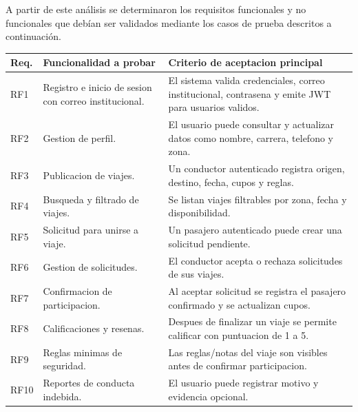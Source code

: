 \documentclass{article}
\begin{document}
A partir de este análisis se determinaron los requisitos funcionales y no funcionales que debían ser validados mediante los casos de prueba descritos a continuación.
\begin{longtable}{p{1.2cm} p{6.2cm} p{6.8cm}}
    \toprule
    \textbf{Req.} & \textbf{Funcionalidad a probar}                       & \textbf{Criterio de aceptacion principal}                                                           \\
    \midrule
    RF1           & Registro e inicio de sesion con correo institucional. & El sistema valida credenciales, correo institucional, contrasena y emite JWT para usuarios validos. \\
    RF2           & Gestion de perfil.                                    & El usuario puede consultar y actualizar datos como nombre, carrera, telefono y zona.                \\
    RF3           & Publicacion de viajes.                                & Un conductor autenticado registra origen, destino, fecha, cupos y reglas.                           \\
    RF4           & Busqueda y filtrado de viajes.                        & Se listan viajes filtrables por zona, fecha y disponibilidad.                                       \\
    RF5           & Solicitud para unirse a viaje.                        & Un pasajero autenticado puede crear una solicitud pendiente.                                        \\
    RF6           & Gestion de solicitudes.                               & El conductor acepta o rechaza solicitudes de sus viajes.                                            \\
    RF7           & Confirmacion de participacion.                        & Al aceptar solicitud se registra el pasajero confirmado y se actualizan cupos.                      \\
    RF8           & Calificaciones y resenas.                             & Despues de finalizar un viaje se permite calificar con puntuacion de 1 a 5.                         \\
    RF9           & Reglas minimas de seguridad.                          & Las reglas/notas del viaje son visibles antes de confirmar participacion.                           \\
    RF10          & Reportes de conducta indebida.                        & El usuario puede registrar motivo y evidencia opcional.                                             \\

\end{longtable}
\end{document}
